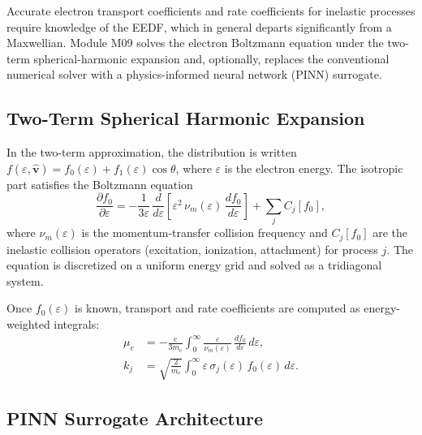 \documentclass[11pt,a4paper]{report}
\begin{document}
Accurate electron transport coefficients and rate coefficients for inelastic processes require knowledge of the EEDF, which in general departs significantly from a Maxwellian.  Module M09 solves the electron Boltzmann equation under the two-term spherical-harmonic expansion and, optionally, replaces the conventional numerical solver with a physics-informed neural network (PINN) surrogate.

\subsection{Two-Term Spherical Harmonic Expansion}

In the two-term approximation, the distribution is written $f(\varepsilon,\hat{\mathbf{v}}) = f_0(\varepsilon) + f_1(\varepsilon)\cos\theta$, where $\varepsilon$ is the electron energy.  The isotropic part satisfies the Boltzmann equation~\cite{Hagelaar2005}
\begin{equation}
  \frac{\partial f_0}{\partial\varepsilon}
  = -\frac{1}{3\varepsilon}\,\frac{d}{d\varepsilon}
    \!\left[\varepsilon^2\,\nu_m(\varepsilon)\,\frac{df_0}{d\varepsilon}\right]
  + \sum_j C_j[f_0],
  \label{eq:bte-twoterm}
\end{equation}
where $\nu_m(\varepsilon)$ is the momentum-transfer collision frequency and $C_j[f_0]$ are the inelastic collision operators (excitation, ionization, attachment) for process $j$.  The equation is discretized on a uniform energy grid and solved as a tridiagonal system.

Once $f_0(\varepsilon)$ is known, transport and rate coefficients are computed as energy-weighted integrals:
\begin{align}
  \mu_e &= -\frac{e}{3m_e}\int_0^\infty
          \frac{\varepsilon}{\nu_m(\varepsilon)}\,
          \frac{df_0}{d\varepsilon}\,d\varepsilon,
  \label{eq:mobility} \\
  k_j   &= \sqrt{\frac{2}{m_e}}\int_0^\infty
          \varepsilon\,\sigma_j(\varepsilon)\,f_0(\varepsilon)\,d\varepsilon.
  \label{eq:rate-coeff}
\end{align}

\subsection{PINN Surrogate Architecture}
\end{document}
